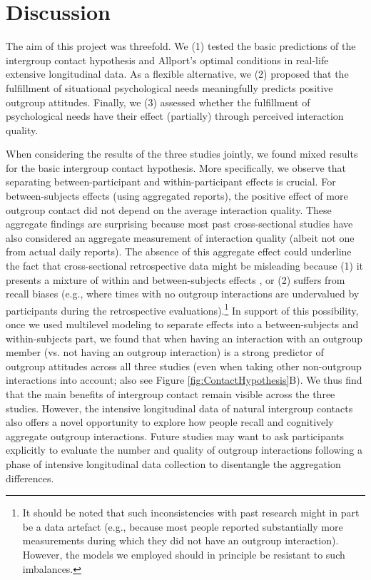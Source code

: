 \documentclass[man, 12pt, a4paper, mask]{apa7}
\theoremstyle{break}
\theoremstyle{plain}
\begin{document}



\section{Discussion}
The aim of this project was threefold. We (1) tested the basic predictions of the intergroup contact hypothesis and Allport's optimal conditions in real-life extensive longitudinal data. As a flexible alternative, we (2) proposed that the fulfillment of situational psychological needs meaningfully predicts positive outgroup attitudes. Finally, we (3) assessed whether the fulfillment of psychological needs have their effect (partially) through perceived interaction quality. 

When considering the results of the three studies jointly, we found mixed results for the basic intergroup contact hypothesis. More specifically, we observe that separating between-participant and within-participant effects is crucial. For between-subjects effects (using aggregated reports), the positive effect of more outgroup contact did not depend on the average interaction quality. These aggregate findings are surprising because most past cross-sectional studies have also considered an aggregate measurement of interaction quality (albeit not one from actual daily reports). The absence of this aggregate effect could underline the fact that cross-sectional retrospective data might be misleading because (1) it presents a mixture of within and between-subjects effects \citep[][]{Hamaker2020}, or (2) suffers from recall biases (e.g., where times with no outgroup interactions are undervalued by participants during the retrospective evaluations).\footnote{It should be noted that such inconsistencies with past research might in part be a data artefact (e.g., because most people reported substantially more measurements during which they did not have an outgroup interaction). However, the models we employed should in principle be resistant to such imbalances.} In support of this possibility, once we used multilevel modeling to separate effects into a between-subjects and within-subjects part, we found that when having an interaction with an outgroup member (vs. not having an outgroup interaction) is a strong predictor of outgroup attitudes across all three studies (even when taking other non-outgroup interactions into account; also see Figure \ref{fig:ContactHypothesis}B). We thus find that the main benefits of intergroup contact remain visible across the three studies. However, the intensive longitudinal data of natural intergroup contacts also offers a novel opportunity to explore how people recall and cognitively aggregate outgroup interactions. Future studies may want to ask participants explicitly to evaluate the number and quality of outgroup interactions following a phase of intensive longitudinal data collection to disentangle the aggregation differences.
\end{document}
